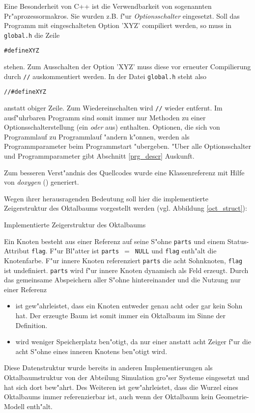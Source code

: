 \label{option_switch}
Eine Besonderheit von C++ ist die Verwendbarkeit von sogenannten 
Pr"aprozessormakros. Sie wurden z.B. f"ur \emph{Optionsschalter} eingesetzt. 
Soll das Programm mit eingeschalteten Option 'XYZ' compiliert werden, 
so muss in \texttt{global.h} die Zeile 
\begin{alltt}
\#define XYZ
\end{alltt}
stehen. Zum Ausschalten der Option 'XYZ' muss diese vor erneuter Compilierung 
durch \texttt{//} auskommentiert werden. 
In der Datei \texttt{global.h} steht also 
\begin{alltt}
//#define XYZ
\end{alltt}
anstatt obiger Zeile. Zum Wiedereinschalten wird \texttt{//} wieder entfernt. 
Im ausf"uhrbaren Programm sind somit immer nur Methoden zu einer 
Optionsschalterstellung (ein \emph{oder} aus) enthalten. Optionen, die 
sich von Programmlauf zu Programmlauf "andern k"onnen, werden als 
Programmparameter beim Programmstart "ubergeben. "Uber alle Optionsschalter 
und Programmparameter gibt Abschnitt \ref{prg_descr} Auskunft.

Zum besseren Verst"andnis des Quellcodes wurde eine Klassenreferenz mit Hilfe 
von \emph{doxygen} (\cite{doxygen}) generiert.

Wegen ihrer herausragenden Bedeutung soll hier die implementierte 
Zeigerstruktur des Oktalbaums vorgestellt werden 
(vgl. Abbildung \ref{oct_struct}): 

\diabeg
\begin{alltt}

\end{alltt}
\caption{Implementierte Zeigerstruktur des Oktalbaums}\label{oct_struct}
\diaend

Ein Knoten besteht aus einer Referenz auf seine S"ohne \texttt{parts} und 
einem Status-Attribut \texttt{flag}. F"ur Bl"atter ist 
\texttt{parts}~$=$~\texttt{NULL} und \texttt{flag} enth"alt die Knotenfarbe. 
F"ur innere Knoten referenziert \texttt{parts} die acht Sohnknoten, 
\texttt{flag} ist undefiniert. 
\texttt{parts} wird f"ur innere Knoten dynamisch als Feld erzeugt. 
Durch das gemeinsame Abspeichern aller S"ohne hintereinander und die Nutzung 
nur einer Referenz 
\begin{itemize}
\item ist gew"ahrleistet, dass ein Knoten entweder genau acht oder gar kein 
    Sohn hat. Der erzeugte Baum ist somit immer ein Oktalbaum im Sinne der 
    Definition. 
\item wird weniger Speicherplatz ben"otigt, da nur einer anstatt acht Zeiger  
    f"ur die acht S"ohne eines inneren Knotens ben"otigt wird.
\end{itemize}
Diese Datenstruktur wurde bereits in anderen Implementierungen als 
Oktalbaumstruktur von der Abteilung Simulation gro"ser Systeme eingesetzt und 
hat sich dort bew"ahrt. 
Des Weiteren ist gew"ahrleistet, dass die Wurzel eines Oktalbaums immer 
referenzierbar ist, auch wenn der Oktalbaum kein Geometrie-Modell enth"alt. 

